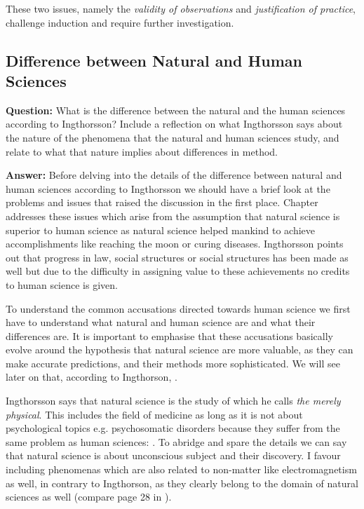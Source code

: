 \documentclass[11pt]{scrartcl}
\begin{document}
These two issues, namely the \textit{validity of observations} and \textit{justification of practice}, challenge induction and require further investigation.

\subsection{Difference between Natural and Human Sciences}

\textbf{Question:} What is the difference between the natural and the human sciences according to Ingthorsson? Include a reflection on what Ingthorsson says about the nature of the phenomena that the natural and human sciences study, and relate to what that nature implies about differences in method.

\textbf{Answer:} Before delving into the details of the difference between natural and human sciences according to Ingthorsson we should have a brief look at the problems and issues that raised the discussion in the first place. Chapter  \cite[p. 29]{ingtho} addresses these issues which arise from the assumption that natural science is superior to human science as natural science helped mankind to achieve accomplishments like reaching the moon or curing diseases. Ingthorsson points out that progress in law, social structures or social structures has been made as well but due to the difficulty in assigning value to these achievements no credits to human science is given.

To understand the common accusations directed towards human science we first have to understand what natural and human science are and what their differences are. It is important to emphasise that these accusations basically evolve around the hypothesis that natural science are more valuable, as they can make accurate predictions, and their methods more sophisticated. We will see later on that, according to Ingthorson,  \cite[p. 40]{ingtho}.

Ingthorsson says that natural science is the study of  \cite[p. 40]{ingtho} which he calls \textit{the merely physical}. This includes the field of medicine as long as it is not about psychological topics e.g. psychosomatic disorders because they suffer from the same problem as human sciences:  \cite[p. 28]{ingtho}. To abridge and spare the details we can say that natural science is about unconscious subject and their discovery. I favour including phenomenas which are also related to non-matter like electromagnetism as well, in contrary to Ingthorson, as they clearly belong to the domain of natural sciences as well (compare page 28 in \cite{ingtho}).
\end{document}
